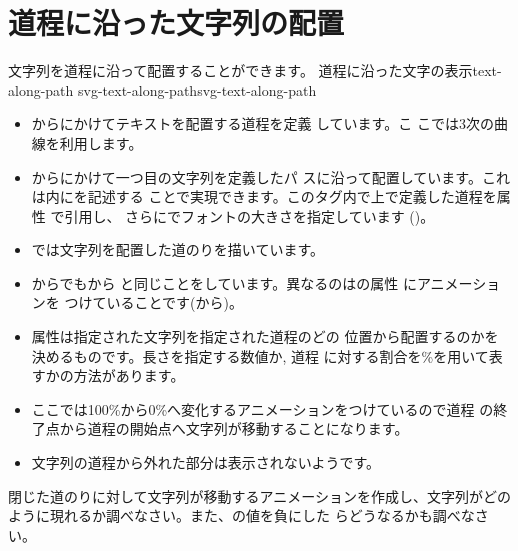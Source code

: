 \section{道程に沿った文字列の配置}
文字列を道程に沿って配置することができます。
    {道程に沿った文字の表示}{text-along-path}
{}
{svg-text-along-path}{svg-text-along-path}
\begin{itemize}
 \item {}からにかけてテキストを配置する道程を定義
       しています。こ
       こでは3次の\Bezier 曲線を利用します。
 \item {}からにかけて一つ目の文字列を定義したパ
       スに沿って配置しています。これは内にを記述する
       ことで実現できます。このタグ内で上で定義した道程を属性
       で引用し、
       さらにでフォントの大きさを指定しています
       ()。
 \item {}では文字列を配置した道のりを描いています。
 \item {}からでもから
       と同じことをしています。異なるのはの属性
       にアニメーションを
       つけていることです(から)。
 \item 属性は指定された文字列を指定された道程のどの
       位置から配置するのかを決めるものです。長さを指定する数値か, 道程
       に対する割合を\%を用いて表すかの方法があります。
 \item ここでは100\%から0\%へ変化するアニメーションをつけているので道程
       の終了点から道程の開始点へ文字列が移動することになります。
 \item 文字列の道程から外れた部分は表示されないようです。
\end{itemize}
\begin{Problem}
閉じた道のりに対して文字列が移動するアニメーションを作成し、文字列がどの
 ように現れるか調べなさい。また、の値を負にした
 らどうなるかも調べなさい。
\end{Problem}

